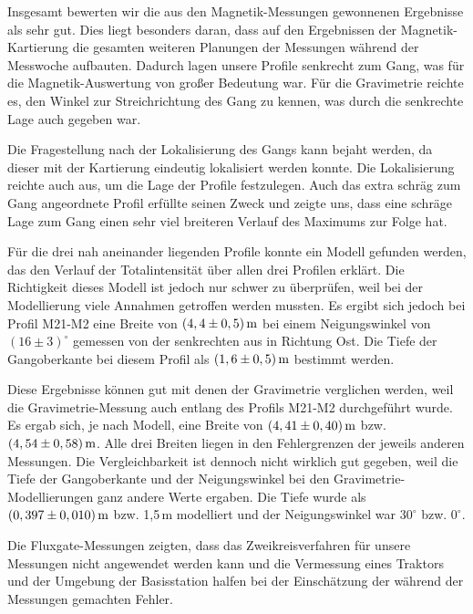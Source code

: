 Insgesamt bewerten wir die aus den Magnetik-Messungen gewonnenen Ergebnisse als sehr gut. Dies liegt besonders daran, dass auf den Ergebnissen der Magnetik-Kartierung die gesamten weiteren Planungen der Messungen während der Messwoche aufbauten. Dadurch lagen unsere Profile senkrecht zum Gang, was für die Magnetik-Auswertung von großer Bedeutung war. Für die Gravimetrie reichte es, den Winkel zur Streichrichtung des Gang zu kennen, was durch die senkrechte Lage auch gegeben war.

Die Fragestellung nach der Lokalisierung des Gangs kann bejaht werden, da dieser mit der Kartierung eindeutig lokalisiert werden konnte. Die Lokalisierung reichte auch aus, um die Lage der Profile festzulegen. Auch das extra schräg zum Gang angeordnete Profil erfüllte seinen Zweck und zeigte uns, dass eine schräge Lage zum Gang einen sehr viel breiteren Verlauf des Maximums zur Folge hat.

Für die drei nah aneinander liegenden Profile konnte ein Modell gefunden werden, das den Verlauf der Totalintensität über allen drei Profilen erklärt. Die Richtigkeit dieses Modell ist jedoch nur schwer zu überprüfen, weil bei der Modellierung viele Annahmen getroffen werden mussten. Es ergibt sich jedoch bei Profil M21-M2 eine Breite von $(4,4\pm0,5)\,\mathrm{m}$ bei einem Neigungswinkel von $(16\pm3)^\circ$ gemessen von der senkrechten aus in Richtung Ost. Die Tiefe der Gangoberkante bei diesem Profil als $(1,6\pm0,5)\,\mathrm{m}$ bestimmt werden.

Diese Ergebnisse können gut mit denen der Gravimetrie verglichen werden, weil die Gravimetrie-Messung auch entlang des Profils M21-M2 durchgeführt wurde. Es ergab sich, je nach Modell, eine Breite von $(4,41\pm0,40)\,\mathrm{m}$ bzw. $(4,54\pm0,58)\,\mathrm{m}$. Alle drei Breiten liegen in den Fehlergrenzen der jeweils anderen Messungen. Die Vergleichbarkeit ist dennoch nicht wirklich gut gegeben, weil die Tiefe der Gangoberkante und der Neigungswinkel bei den Gravimetrie-Modellierungen ganz andere Werte ergaben. Die Tiefe wurde als $(0,397\pm0,010)\,\mathrm{m}$ bzw. 1,5\,m modelliert und der Neigungswinkel war $30^\circ$ bzw. $0^\circ$.

Die Fluxgate-Messungen zeigten, dass das Zweikreisverfahren für unsere Messungen nicht angewendet werden kann und die Vermessung eines Traktors und der Umgebung der Basisstation halfen bei der Einschätzung der während der Messungen gemachten Fehler.